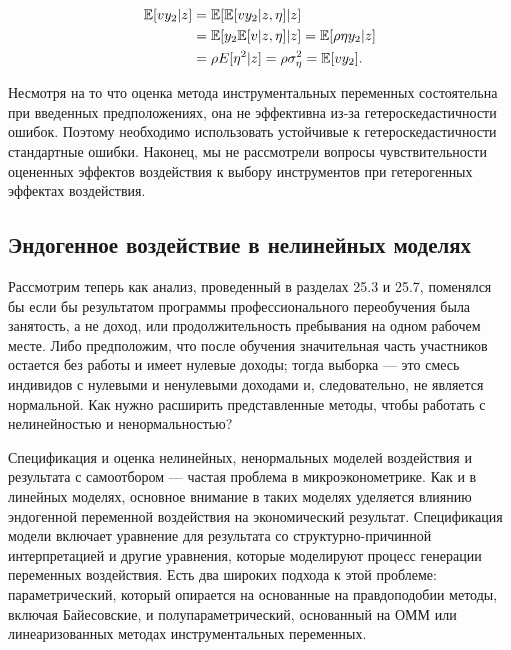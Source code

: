 \begin{align}
\label{eq25.75}
\mathbb{E}[vy_2|z] & = \mathbb{E}[\mathbb{E}[vy_2|z,\eta] | z]  \\
& = \mathbb{E}[y_2 \mathbb{E}[v|z,\eta] | z] = \mathbb{E}[\rho \eta y_2 | z] \nonumber \\
& = \rho E[\eta^2 | z] = \rho \sigma_{\eta}^2 = \mathbb{E}[v y_2]. \nonumber
\end{align}

Несмотря на то что оценка метода инструментальных переменных состоятельна при введенных предположениях, она не эффективна из-за гетероскедастичности ошибок. Поэтому необходимо использовать устойчивые к гетероскедастичности стандартные ошибки. Наконец, мы не рассмотрели вопросы чувствительности оцененных эффектов воздействия к выбору инструментов при гетерогенных эффектах воздействия. 

\subsection{Эндогенное воздействие в нелинейных моделях}

Рассмотрим теперь как анализ, проведенный в разделах 25.3 и 25.7, поменялся бы если бы результатом программы профессионального переобучения была занятость, а не доход, или продолжительность пребывания на одном рабочем месте. Либо предположим, что после обучения значительная часть участников остается без работы и имеет нулевые доходы; тогда выборка --- это смесь индивидов с нулевыми и ненулевыми доходами и, следовательно, не является нормальной. Как нужно расширить представленные методы, чтобы работать с нелинейностью и ненормальностью?

Спецификация и оценка нелинейных, ненормальных моделей воздействия и результата с самоотбором --- частая проблема в микроэконометрике. Как и в линейных моделях, основное внимание в таких моделях уделяется влиянию эндогенной переменной воздействия на экономический результат. Спецификация модели включает уравнение для результата со структурно-причинной интерпретацией и другие уравнения, которые моделируют процесс генерации переменных воздействия. Есть два широких подхода к этой проблеме: параметрический, который опирается на основанные на правдоподобии методы, включая Байесовские, и полупараметрический, основанный на ОММ или линеаризованных методах инструментальных переменных. 

